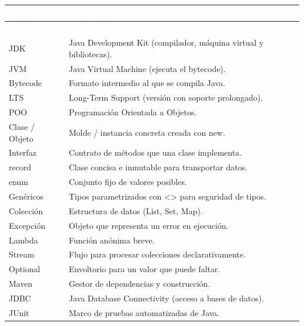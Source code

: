 \documentclass[11pt]{article}
\begin{document}
{\renewcommand{\arraystretch}{1.25}
\begin{longtable}{>{\raggedright\arraybackslash}p{3cm} >{\raggedright\arraybackslash}p{12.4cm}}
\rowcolor{javaazul}\textcolor{white}{\textbf{Término}} & \textcolor{white}{\textbf{Significado}} \\
\endfirsthead
\rowcolor{javaazul}\textcolor{white}{\textbf{Término}} & \textcolor{white}{\textbf{Significado}} \\
\endhead
\ttfamily\color{javaazul}JDK & Java Development Kit (compilador, máquina virtual y bibliotecas). \\ \hline
\ttfamily\color{javaazul}JVM & Java Virtual Machine (ejecuta el bytecode). \\ \hline
\ttfamily\color{javaazul}Bytecode & Formato intermedio al que se compila Java. \\ \hline
\ttfamily\color{javaazul}LTS & Long-Term Support (versión con soporte prolongado). \\ \hline
\ttfamily\color{javaazul}POO & Programación Orientada a Objetos. \\ \hline
\ttfamily\color{javaazul}Clase / Objeto & Molde / instancia concreta creada con new. \\ \hline
\ttfamily\color{javaazul}Interfaz & Contrato de métodos que una clase implementa. \\ \hline
\ttfamily\color{javaazul}record & Clase concisa e inmutable para transportar datos. \\ \hline
\ttfamily\color{javaazul}enum & Conjunto fijo de valores posibles. \\ \hline
\ttfamily\color{javaazul}Genéricos & Tipos parametrizados con \textless{}\textgreater{} para seguridad de tipos. \\ \hline
\ttfamily\color{javaazul}Colección & Estructura de datos (List, Set, Map). \\ \hline
\ttfamily\color{javaazul}Excepción & Objeto que representa un error en ejecución. \\ \hline
\ttfamily\color{javaazul}Lambda & Función anónima breve. \\ \hline
\ttfamily\color{javaazul}Stream & Flujo para procesar colecciones declarativamente. \\ \hline
\ttfamily\color{javaazul}Optional & Envoltorio para un valor que puede faltar. \\ \hline
\ttfamily\color{javaazul}Maven & Gestor de dependencias y construcción. \\ \hline
\ttfamily\color{javaazul}JDBC & Java Database Connectivity (acceso a bases de datos). \\ \hline
\ttfamily\color{javaazul}JUnit & Marco de pruebas automatizadas de Java. \\ \hline
\end{longtable}}
\end{document}

